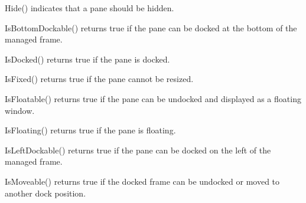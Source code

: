 \label{wxauipaneinfohide}


Hide() indicates that a pane should be hidden.

\label{wxauipaneinfoisbottomdockable}


IsBottomDockable() returns true if the pane can be docked at the bottom of the managed frame.

\label{wxauipaneinfoisdocked}


IsDocked() returns true if the pane is docked.

\label{wxauipaneinfoisfixed}


IsFixed() returns true if the pane cannot be resized.

\label{wxauipaneinfoisfloatable}


IsFloatable() returns true if the pane can be undocked and displayed as a floating window.

\label{wxauipaneinfoisfloating}


IsFloating() returns true if the pane is floating.

\label{wxauipaneinfoisleftdockable}


IsLeftDockable() returns true if the pane can be docked on the left of the managed frame.

\label{wxauipaneinfoismovable}


IsMoveable() returns true if the docked frame can be undocked or moved to another dock position.

\label{wxauipaneinfoisok}


